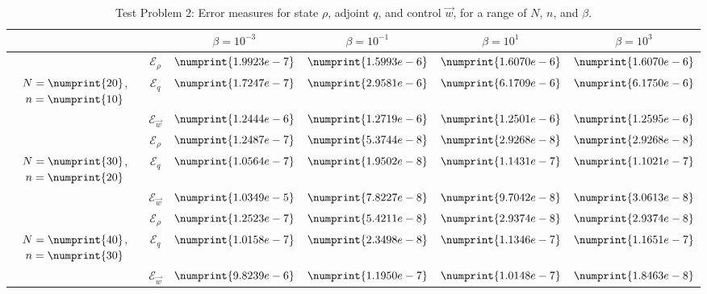 \documentclass[11pt, a4paper]{article}
\theoremstyle{definition}
\newcommand{\adj}{q}
\begin{document}
\begin{table}
	\begin{tabular}{ | c | c || c | c | c | c ||}
		\hline
		\multicolumn{2}{|c||}{} & $\beta = 10^{-3}$ & $\beta = 10^{-1}$ & $\beta = 10^{1}$ & $\beta = 10^{3}$  \\
		\hline
		\hline
		& $\mathcal{E}_\rho$ & $\numprint{1.9923e-7}$ & $\numprint{1.5993e-6}$ & $\numprint{1.6070e-6}$ & $\numprint{1.6070e-6}$ \\
		$N = \numprint{20}$, $n = \numprint{10}$  & $\mathcal{E}_\adj$ & $\numprint{1.7247e-7}$ & $\numprint{2.9581e-6}$ & $\numprint{6.1709e-6}$ & $\numprint{6.1750e-6}$ \\
		& $\mathcal{E}_{\vec{w}}$ & $\numprint{1.2444e-6}$ & $\numprint{1.2719e-6}$ & $\numprint{1.2501e-6}$ & $\numprint{1.2595e-6}$ \\
		\hline
		& $\mathcal{E}_\rho$ & $\numprint{1.2487e-7}$ & $\numprint{5.3744e-8}$ & $\numprint{2.9268e-8}$ & $\numprint{2.9268e-8}$ \\
		$N = \numprint{30}$, $n = \numprint{20}$  & $\mathcal{E}_\adj$ & $\numprint{1.0564e-7}$ & $\numprint{1.9502e-8}$ & $\numprint{1.1431e-7}$ & $\numprint{1.1021e-7}$ \\
		& $\mathcal{E}_{\vec{w}}$ & $\numprint{1.0349e-5}$ & $\numprint{7.8227e-8}$ & $\numprint{9.7042e-8}$ & $\numprint{3.0613e-8}$ \\
		\hline
		& $\mathcal{E}_\rho$ & $\numprint{1.2523e-7}$ & $\numprint{5.4211e-8}$ & $\numprint{2.9374e-8}$ & $\numprint{2.9374e-8}$ \\
		$N = \numprint{40}$, $n = \numprint{30}$  & $\mathcal{E}_\adj$ & $\numprint{1.0158e-7}$ & $\numprint{2.3498e-8}$ & $\numprint{1.1346e-7}$ & $\numprint{1.1651e-7}$ \\
		& $\mathcal{E}_{\vec{w}}$ & $\numprint{9.8239e-6}$ & $\numprint{1.1950e-7}$ & $\numprint{1.0148e-7}$ & $\numprint{1.8463e-8}$ \\
		\hline
	\end{tabular}
	\caption{Test Problem 2: Error measures for state $\rho$, adjoint $\adj$, and control $\vec{w}$, for a range of $N$, $n$, and $\beta$.}
	\label{TabA1:Prob2}
\end{table}
\end{document}
